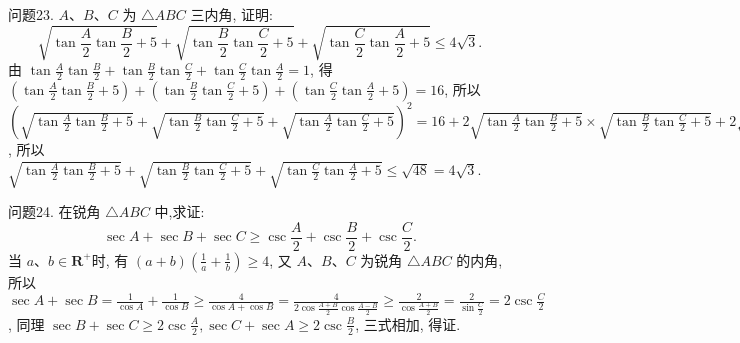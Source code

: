 问题23. $ A 、 B 、 C$ 为 $\triangle A B C$ 三内角, 证明:
$$
\sqrt{\tan \frac{A}{2} \tan \frac{B}{2}+5}+\sqrt{\tan \frac{B}{2} \tan \frac{C}{2}+5}+\sqrt{\tan \frac{C}{2} \tan \frac{A}{2}+5} \leqslant 4 \sqrt{3} .
$$
由 $\tan \frac{A}{2} \tan \frac{B}{2}+\tan \frac{B}{2} \tan \frac{C}{2}+\tan \frac{C}{2} \tan \frac{A}{2}=1$, 得 $\left(\tan \frac{A}{2} \tan \frac{B}{2}+5\right)+ \left(\tan \frac{B}{2} \tan \frac{C}{2}+5\right)+\left(\tan \frac{C}{2} \tan \frac{A}{2}+5\right)=16$, 所以 $\left(\sqrt{\tan \frac{A}{2} \tan \frac{B}{2}+5}+\right. \left.\sqrt{\tan \frac{B}{2} \tan \frac{C}{2}+5}+\sqrt{\tan \frac{A}{2} \tan \frac{C}{2}+5}\right)^2=16+2 \sqrt{\tan \frac{A}{2} \tan \frac{B}{2}+5} \times \sqrt{\tan \frac{B}{2} \tan \frac{C}{2}+5}+2 \sqrt{\tan \frac{A}{2} \tan \frac{B}{2}+5} \sqrt{\tan \frac{C}{2} \tan \frac{A}{2}+5}+2 \sqrt{\tan \frac{B}{2} \tan \frac{C}{2}+5} \sqrt{\tan \frac{C}{2} \tan \frac{A}{2}+5} \leqslant 16+\tan \frac{A}{2} \tan \frac{B}{2}+5+\tan \frac{B}{2} \tan \frac{C}{2}+5+\tan \frac{A}{2} \tan \frac{B}{2}+ 5+\tan \frac{C}{2} \tan \frac{A}{2}+5+\tan \frac{B}{2} \tan \frac{C}{2}+5+\tan \frac{C}{2} \tan \frac{A}{2}+5=16+30+2=48$,
所以 $\sqrt{\tan \frac{A}{2} \tan \frac{B}{2}+5}+\sqrt{\tan \frac{B}{2} \tan \frac{C}{2}+5}+\sqrt{\tan \frac{C}{2} \tan \frac{A}{2}+5} \leqslant \sqrt{48}= 4 \sqrt{3}$.



问题24. 在锐角 $\triangle A B C$ 中,求证:
$$
\sec A+\sec B+\sec C \geqslant \csc \frac{A}{2}+\csc \frac{B}{2}+\csc \frac{C}{2} .
$$
当 $a 、 b \in \mathbf{R}^{+}$时, 有 $(a+b)\left(\frac{1}{a}+\frac{1}{b}\right) \geqslant 4$, 又 $A 、 B 、 C$ 为锐角 $\triangle A B C$ 的内角, 所以 $\sec A+\sec B=\frac{1}{\cos A}+\frac{1}{\cos B} \geqslant \frac{4}{\cos A+\cos B}= \frac{4}{2 \cos \frac{A+B}{2} \cos \frac{A-B}{2}} \geqslant \frac{2}{\cos \frac{A+B}{2}}=\frac{2}{\sin \frac{C}{2}}=2 \csc \frac{C}{2}$, 同理 $\sec B+\sec C \geqslant 2 \csc \frac{A}{2}, \sec C+\sec A \geqslant 2 \csc \frac{B}{2}$, 三式相加, 得证.



